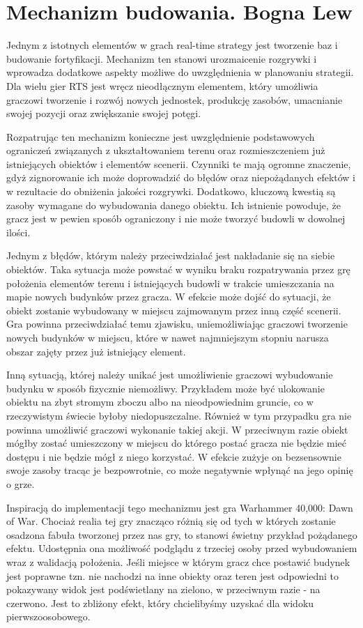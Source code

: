 \section{Mechanizm budowania. Bogna Lew}\label{chap:build}
Jednym z istotnych elementów w grach real-time strategy jest tworzenie baz i budowanie fortyfikacji. Mechanizm ten stanowi urozmaicenie rozgrywki i wprowadza dodatkowe aspekty możliwe do uwzględnienia w planowaniu strategii. Dla wielu gier RTS jest wręcz nieodłącznym elementem, który umożliwia graczowi tworzenie i rozwój nowych jednostek, produkcję zasobów, umacnianie swojej pozycji oraz zwiększanie swojej potęgi.

Rozpatrując ten mechanizm konieczne jest uwzględnienie podstawowych ograniczeń związanych z ukształtowaniem terenu oraz rozmieszczeniem już istniejących obiektów i elementów scenerii. Czynniki te mają ogromne znaczenie, gdyż zignorowanie ich może doprowadzić do błędów oraz niepożądanych efektów i w rezultacie do obniżenia jakości rozgrywki. Dodatkowo, kluczową kwestią są zasoby wymagane do wybudowania danego obiektu. Ich istnienie powoduje, że gracz jest w pewien sposób ograniczony i nie może tworzyć budowli w dowolnej ilości.

Jednym z błędów, którym należy przeciwdziałać jest nakładanie się na siebie obiektów. Taka sytuacja może powstać w wyniku braku rozpatrywania przez grę położenia elementów terenu i istniejących budowli w trakcie umieszczania na mapie nowych budynków przez gracza. W efekcie może dojść do sytuacji, że obiekt zostanie wybudowany w miejscu zajmowanym przez inną część scenerii. Gra powinna przeciwdziałać temu zjawisku, uniemożliwiając graczowi tworzenie nowych budynków w miejscu, które w nawet najmniejszym stopniu narusza obszar zajęty przez już istniejący element.

Inną sytuacją, której należy unikać jest umożliwienie graczowi wybudowanie budynku w sposób fizycznie niemożliwy. Przykładem może być ulokowanie obiektu na zbyt stromym zboczu albo na nieodpowiednim gruncie, co w rzeczywistym świecie byłoby niedopuszczalne. Również w tym przypadku gra nie powinna umożliwić graczowi wykonanie takiej akcji. W przeciwnym razie obiekt mógłby zostać umieszczony w miejscu do którego postać gracza nie będzie mieć dostępu i nie będzie mógł z niego korzystać. W efekcie zużyje on bezsensownie swoje zasoby tracąc je bezpowrotnie, co może negatywnie wpłynąć na jego opinię o grze.

Inspiracją do implementacji tego mechanizmu jest gra Warhammer 40,000: Dawn of War. Chociaż realia tej gry znacząco różnią się od tych w których zostanie osadzona fabuła tworzonej przez nas gry, to stanowi świetny przykład pożądanego efektu. Udostępnia ona możliwość podglądu z trzeciej osoby przed wybudowaniem wraz z walidacją położenia. Jeśli miejsce w którym gracz chce postawić budynek jest poprawne tzn. nie nachodzi na inne obiekty oraz teren jest odpowiedni to pokazywany widok jest podświetlany na zielono, w przeciwnym razie - na czerwono. Jest to zbliżony efekt, który chcielibyśmy uzyskać dla widoku pierwszoosobowego.


